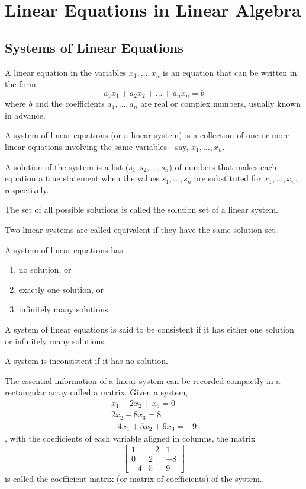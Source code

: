 \documentclass[../linalg.tex]{subfiles}
\begin{document}
\chapter{Linear Equations in Linear Algebra}
\section{Systems of Linear Equations}
A linear equation in the variables $x_1,\dots,x_n$ is an equation that can be written in the form 
\[ a_1x_1+a_2x_2+\dots + a_nx_n=b\]
where $b$ and the coefficients $a_1,\dots,a_n$ are real or complex numbers, usually known in advance.

A system of linear equations (or a linear system) is a collection of one or more linear equations involving the same variables - say, $x_1,\dots,x_n$.

A solution of the system is a list ($s_1,s_2,\dots,s_n$) of numbers that makes each equation a true statement when the values $s_1,\dots,s_n$ are substituted for $x_1,\dots,x_n$, respectively.

The set of all possible solutions is called the solution set of a linear system.

Two linear systems are called equivalent if they have the same solution set.

A system of linear equations has 
\begin{enumerate}
    \item no solution, or
    \item exactly one solution, or
    \item infinitely many solutions.
\end{enumerate}

A system of linear equations is said to be consistent if it has either one solution or infinitely many solutions.

A system is inconsistent if it has no solution.

The essential information of a linear system can be recorded compactly in a rectangular array called a matrix. Given a system,
\begin{align*}
    x_1-2x_2+x_3=0\\
    2x_2-8x_3=8\\
    -4x_1+5x_2+9x_3=-9
\end{align*}, with the coefficients of each variable aligned in columns, the matrix 
\[ \begin{bmatrix}
    1&-2&1\\ 0&2&-8\\ -4&5&9
\end{bmatrix} \]
is called the coefficient matrix (or matrix of coefficients) of the system.
\end{document}
